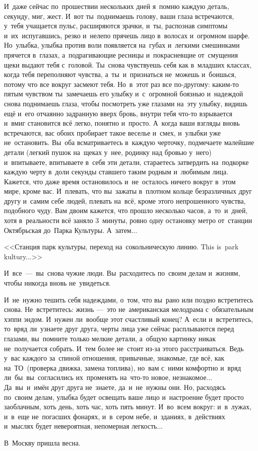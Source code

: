 И~даже сейчас по~прошествии нескольких дней я~помню каждую деталь, секунду, миг, жест.
И~вот ты~поднимаешь голову, ваши глаза встречаются, у~тебя учащается пульс, расширяются зрачки, и~ты, распознав симптомы и~их~испугавшись, резко и~нелепо прячешь лицо в~волосах и~огромном шарфе.
Но~улыбка, улыбка против воли появляется на~губах и~легкими смешинками прячется в~глазах, а~подрагивающие ресницы и~покрасневщие от~смущения щеки выдают тебя с~головой.
Ты~снова чувствуешь себя как в~младших классах, когда тебя переполняют чувства, а~ты~и~признаться не~можешь и~боишься, потому что все вокруг засмеют тебя.
Но~в~этот раз все по-другому: каким-то пятым чувством ты~замечаешь его улыбку и~с~огромной боязнью и~надеждой снова поднимаешь глаза, чтобы посмотреть уже глазами на~эту улыбку, видишь ещё и~его отчаянно задранную вверх бровь, внутри тебя что-то взрывается и~вмиг становится всё легко, понятно и~просто.
А~когда ваши взгляды вновь встречаются, вас обоих пробирает такое веселье и~смех, и~улыбки уже не~остановить.
Вы~оба всматриваетесь в~каждую черточку, подмечаете малейшие детали (легкий пушок на~щеках у~нее, родинку над бровью у~него) и~впитываете, впитываете в~себя эти детали, стараетесь затвердить на~подкорке каждую черту в~доли секунды ставшего таким родным и~любимым лица.
Кажется, что даже время остановилось и~не~осталось ничего вокруг в~этом мире, кроме вас.
И~плевать, что вы~зажаты в~плотном кольце безразличных друг другу и~самим себе людей, плевать на~всё, кроме этого непрошенного чувства, подобного чуду.
Вам двоим кажется, что прошло несколько часов, а~то~и~дней, хотя в~реальности всё заняло 3~минуты, ровно одну остановку метро от~станции Октябрьская до~Парка Культуры.
А~затем...


{\tt

\vspace{5mm}
<<Станция парк культуры, переход на~сокольническую линию.
This is~park kultury...>>
\vspace{5mm}
}


И~все~---~вы~снова чужие люди.
Вы~расходитесь по~своим делам и~жизням, чтобы никогда вновь не~увидеться.

И~не~нужно тешить себя надеждами, о~том, что вы~рано или поздно встретитесь снова.
Не~встретитесь: жизнь ---~это не~американская мелодрама с~обязательным хэппи эндом.
И~нужен ли~вообще этот счастливый конец? А~если и~встретитесь, то~вряд ли~узнаете друг друга, черты лица уже сейчас расплываются перед глазами, вы~помните только мелкие детали, а~общую картинку никак не~получается собрать.
И~тем более не~стоит из-за этого расстраиваться.
Ведь у~вас каждого за~спиной отношения, привычные, знакомые, где всё, как на~ТО~(проверка движка, замена топлива), но~вам с~ними комфортно и~вряд ли~бы~вы~согласились их~променять на~что-то новое, незнакомое... 
~
Да~вы~и~имён друг друга не~знаете, да~и~не~нужны они.
Но, расходясь по~своим делам, улыбка будет освещать ваше лицо и~настроение будет просто заоблачным, хоть день, хоть час, хоть пять минут.
И~во~всем вокруг: и~в~лужах, и~в~еще не~погасших фонарях, и~в~сером небе, и~зданиях, в~действиях и~мыслях будет невероятная, непомерная легкость...

В~Москву пришла весна.